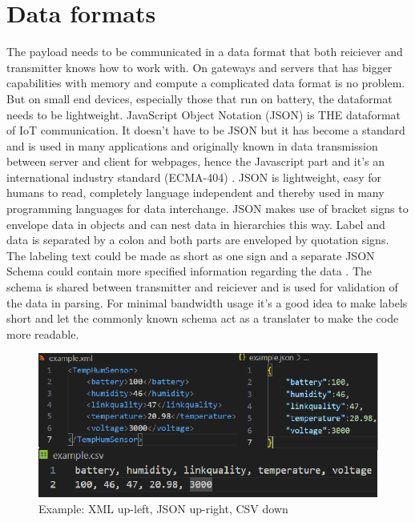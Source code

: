 \documentclass[article,a4paper]{IEEEtran}
\begin{document}
\section{Data formats}  
The payload needs to be communicated in a data format that both reiciever and transmitter knows how to work with. On gateways and servers that has bigger capabilities with memory and compute a complicated data format is no problem. But on small end devices, especially those that run on battery, the dataformat needs to be lightweight.
\newline\newline      
JavaScript Object Notation (JSON) is THE dataformat of IoT communication. It doesn't have to be JSON but it has become a standard and is used in many applications and originally known in data transmission between server and client for webpages, hence the Javascript part and it's an international industry standard (ECMA-404) \cite{JSONstandard}. JSON is lightweight, easy for humans to read, completely language independent and thereby used in many programming languages for data interchange\cite{JSONintro}. JSON makes use of bracket signs to envelope data in objects and can nest data in hierarchies this way. Label and data is separated by a colon and both parts are enveloped by quotation signs. The labeling text could be made as short as one sign and a separate JSON Schema could contain more specified information regarding the data \cite{JSONformat}. The schema is shared between transmitter and reiciever and is used for validation of the data in parsing. For minimal bandwidth usage it's a good idea to make labels short and let the commonly known schema act as a translater to make the code more readable.
\begin{figure}
    \includegraphics[width=\columnwidth]{JSON-XML-CSV.png} 
    \caption{ Example: XML up-left, JSON up-right, CSV down }
    \label{fig1:XML and JSON example}   
\end{figure}   
\newline\newline
\end{document}
